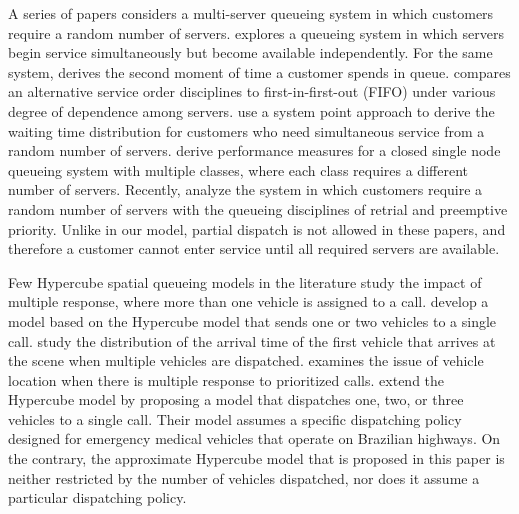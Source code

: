 \documentclass[11pt]{article}\topmargin 0mm
\begin{document}
{\color{blue}
A series of papers considers a multi-server
queueing system in which customers require a random number of servers.
\citet{green1980queueing} explores a queueing system in which
servers begin service simultaneously but become available
independently. For the same system, \citet{seila1984waiting}
derives the second moment of time a customer spends in queue.
\citet{green1981comparing} compares an alternative service
order disciplines to first-in-first-out (FIFO) under various degree of dependence
among servers. \citet{brill1984queues} use a system point
approach to derive the waiting time distribution for
customers who need simultaneous service from a random number of
servers. \citet{fletcher1986queueing} derive performance measures for a closed single node queueing system with multiple classes, where each class requires a different number of servers. Recently, \citet{vinayak2014study} analyze the system in which customers require a random number of servers with the queueing disciplines of retrial and preemptive priority. Unlike in our model, partial dispatch is not allowed in these papers, and therefore a customer cannot enter service until all required servers are available.
}

Few Hypercube spatial queueing models in the literature study
the impact of multiple response, where more than one vehicle
is assigned to a call.
\citet{ChelstBarlach81} develop a
model based on the Hypercube model that sends one or two
vehicles to a single call. \citet{daskin1984multiple} study the
distribution of the arrival time of the first vehicle that
arrives at the scene when multiple vehicles are dispatched.
\citet{McLay09} examines the issue of vehicle location when
there is multiple response to prioritized calls.
\citet{iannoni2007multiple} extend the Hypercube model by
proposing a model that dispatches one, two, or three vehicles
to a single call. Their model assumes a specific dispatching
policy designed for emergency medical vehicles that operate on
Brazilian highways. On the contrary, the approximate Hypercube
model that is proposed in this paper is neither restricted by
the number of vehicles dispatched, nor does it assume a
particular dispatching policy.
\end{document}
